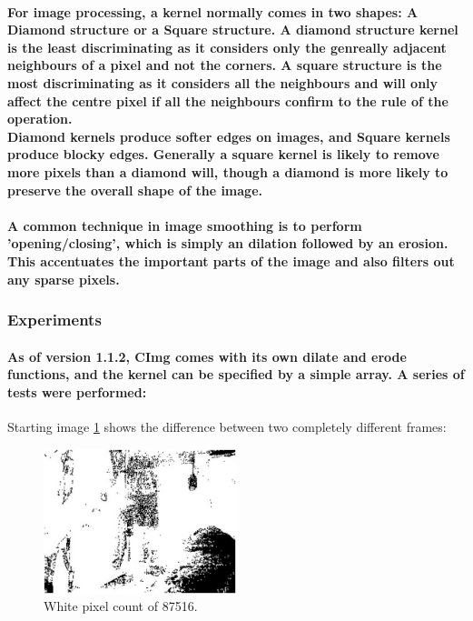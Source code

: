 \documentclass[11pt]{article} %
\begin{document}
\paragraph{For  image processing, a kernel normally comes in two shapes: A Diamond structure or a Square structure. A diamond structure kernel is the least discriminating as it considers only the genreally adjacent neighbours of a pixel and not the corners. A square structure  is the most discriminating as it considers all the neighbours and will only affect the centre pixel if all the neighbours confirm to the rule of the operation.
\\
Diamond kernels produce softer edges on images, and Square kernels produce blocky edges. Generally a square kernel is likely to remove more pixels than a diamond will, though a diamond is more likely to preserve the overall shape of the image.
}
\paragraph{A common technique in image smoothing is to perform 'opening/closing', which is simply an dilation followed by an erosion. This accentuates the important parts of the image and also filters out any sparse pixels.}

\subsubsection{Experiments}
\paragraph{As of version 1.1.2, CImg comes with its own dilate and erode functions, and the kernel can be specified by a simple array. A series of tests were performed:
}
Starting image \cref{img:uneditsub1} shows the difference between two  completely different frames:
\begin{figure}[H]
	\hspace{0.24\textwidth}
	\includegraphics[width=0.5\textwidth]{../images/ImageOps/uneditedsub}
	\caption{White pixel count of 87516.}
	\label{img:uneditsub1}
\end{figure}
\end{document}
